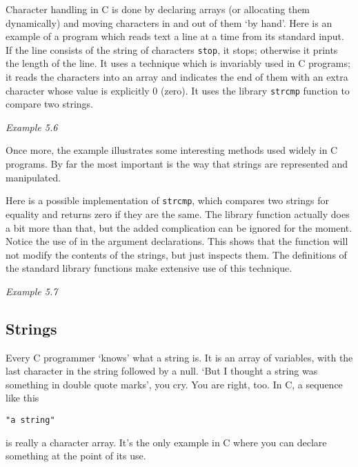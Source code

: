   Character handling in C is done by declaring arrays (or allocating them
   dynamically) and moving characters in and out of them `by hand'.
   Here is an example of a program which reads text a line at a time from
   its standard input. If the line consists of the string of characters
   \texttt{stop}, it stops; otherwise it prints the length of the line.
   It uses a technique which is invariably used in C programs; it reads the
   characters into an array and indicates the end of them with an extra
   character whose value is explicitly 0 (zero). It uses the library
   \texttt{strcmp} function to compare two strings.


   \begin{center}\textit{Example 5.6}\end{center}


  Once more, the example illustrates some interesting methods used widely
   in C programs. By far the most important is the way that strings are
   represented and manipulated.


  Here is a possible implementation of \texttt{strcmp}, which
   compares two strings for equality and returns zero if they are the same.
   The library function actually does a bit more than that, but the added
   complication can be ignored for the moment. Notice the use of
   \const{} in the argument declarations. This shows that the
   function will not modify the contents of the strings, but just inspects
   them. The definitions of the standard library functions make extensive
   use of this technique.


  \begin{center}\textit{Example 5.7}\end{center}


  \subsection{Strings}
   

   Every C programmer `knows' what a string is. It is an array of
    \kchar{} variables, with the last character in the string
    followed by a null. `But I thought a string was something in double
    quote marks', you cry. You are right, too. In C, a sequence like
    this


   \begin{Verbatim}
"a string"
\end{Verbatim}

   is really a character array. It's the only example in C where you can
    declare something at the point of its use.


